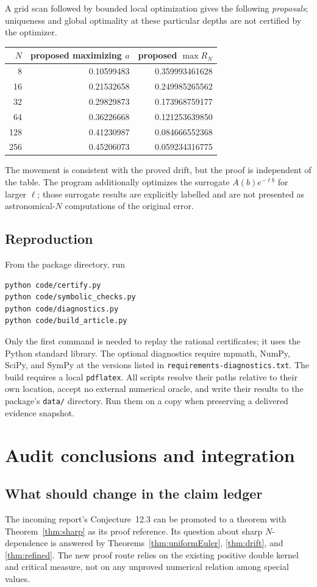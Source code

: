 \documentclass[11pt]{article}
\numberwithin{equation}{section}
\theoremstyle{definition}\newtheorem{definition}[theorem]{Definition}
\theoremstyle{remark}\newtheorem{remark}[theorem]{Remark}
\begin{document}
A grid scan followed by bounded local optimization gives the following
\emph{proposals}; uniqueness and global optimality at these particular
depths are not certified by the optimizer.
\begin{center}
\small
\begin{tabular}{@{}rrr@{}}
\toprule
$N$ & proposed maximizing $a$ & proposed $\max R_N$\\
\midrule
8   & 0.10599483 & 0.359993461628\\
16  & 0.21532658 & 0.249985265562\\
32  & 0.29829873 & 0.173968759177\\
64  & 0.36226668 & 0.121253639850\\
128 & 0.41230987 & 0.084666552368\\
256 & 0.45206073 & 0.059234316775\\
\bottomrule
\end{tabular}
\end{center}
The movement is consistent with the proved drift, but the proof is
independent of the table. The program additionally optimizes the
surrogate $A(b)e^{-\ell b}$ for larger $\ell$; those surrogate results
are explicitly labelled and are not presented as astronomical-$N$
computations of the original error.

\subsection{Reproduction}
From the package directory, run
\begin{verbatim}
python code/certify.py
python code/symbolic_checks.py
python code/diagnostics.py
python code/build_article.py
\end{verbatim}
Only the first command is needed to replay the rational certificates;
it uses the Python standard library. The optional diagnostics require
mpmath, NumPy, SciPy, and SymPy at the versions listed in
\texttt{requirements-diagnostics.txt}. The build requires a local
\texttt{pdflatex}. All scripts resolve their paths relative to their
own location, accept no external numerical oracle, and write their
results to the package's \texttt{data/} directory. Run them on a copy
when preserving a delivered evidence snapshot.

\section{Audit conclusions and integration}
\label{sec:audit}
\subsection{What should change in the claim ledger}
The incoming report's Conjecture~12.3 can be promoted to a theorem with
Theorem~\ref{thm:sharp} as its proof reference. Its question about sharp
$N$-dependence is answered by Theorems~\ref{thm:uniformEuler},
\ref{thm:drift}, and \ref{thm:refined}. The new proof route relies on
the existing positive double kernel and critical measure, not on any
unproved numerical relation among special values.
\end{document}
